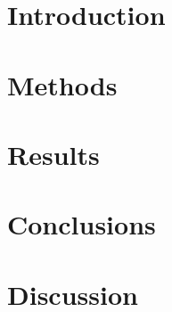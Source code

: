 \section{Introduction}


\section{Methods}

\section{Results}

\section{Conclusions}

\section{Discussion}

